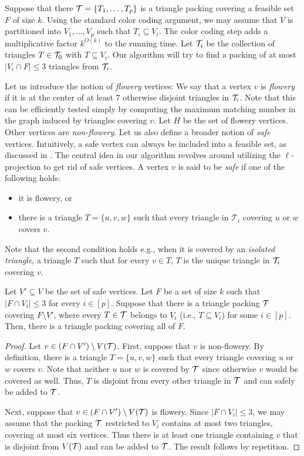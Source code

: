 Suppose that there $\mathcal T=\{T_1,\ldots,T_p\}$ is a triangle packing covering a feasible set $F$ of size $k$.
Using the standard color coding argument, we may assume that $V$ is partitioned into $V_1, \dots, V_p$ such that $T_i \subseteq V_i$.
The color coding step adds a multiplicative factor $k^{O(k)}$ to the running time.
Let $\mathcal T_i$ be the collection of triangles $T \in \mathcal T_0$ with $T \subseteq V_i$.
Our algorithm will try to find a packing of at most $|V_i \cap F| \le 3$ triangles from $\mathcal T_i$.

Let us introduce the notion of \emph{flowery} vertices:
We say that a vertex $v$ is \emph{flowery} if it is at the center of at least
$7$ otherwise disjoint triangles in $\mathcal T_i$.
Note that this can be efficiently
tested simply by computing the maximum
matching number in the graph induced by triangles covering $v$.
Let $H$ be the set of flowery vertices.
Other vertices are \emph{non-flowery}.
Let us also define a broader notion of \emph{safe} vertices.
Intuitively, a safe vertex can always be included into a feasible set, as discussed in .
The central idea in our algorithm revolves around utilizing the $\ell$-projection to get rid of safe vertices.
A vertex $v$ is said to be \emph{safe} if one of the following holds:
\begin{itemize}
  \item 
  it is flowery, or
  \item
  there is a triangle $T = \{ u, v, w \}$ such that every triangle in $\mathcal{T}_i$ covering $u$ or $w$ covers $v$.
\end{itemize}
Note that the second condition holds e.g., when it is covered by an \emph{isolated triangle}, a triangle $T$ such that for every $v \in T$, $T$ is the unique triangle in $\mathcal T_i$ covering $v$.

\begin{lemma} \label{lemma:completable-packing}
  Let $V' \subseteq V$ be the set of safe vertices. 
  Let $F$ be a set of size $k$ such that $|F \cap V_i| \le 3$ for every $i \in [p]$.
  Suppose that there is a triangle packing $\mathcal T$ covering $F \setminus V'$, where every $T \in \mathcal T$ belongs to $V_i$ (i.e., $T \subseteq V_i$) for some $i \in [p]$.
  Then, there is a triangle packing covering all of $F$. 
\end{lemma}
\begin{proof}
  Let $v \in (F \cap V') \setminus V(\mathcal T)$.
  First, suppose that $v$ is non-flowery. 
  By definition, there is a triangle $T = \{ u, v, w \}$ such that every triangle covering $u$ or $w$ covers $v$.
  Note that neither $u$ nor $w$ is covered by $\mathcal T$ since otherwise $v$ would be covered as well.
  Thus, $T$ is disjoint from every other triangle in $\mathcal T$ and can safely be
  added to $\mathcal T$.

  Next, suppose that $v \in (F \cap V') \setminus V(\mathcal T)$ is flowery.
  Since $|F \cap V_i| \le 3$, we may assume that the packing $\mathcal T$ restricted to $V_i$ contains at most two triangles, covering at most six vertices.
  Thus there is at least
  one triangle containing $v$ that is disjoint
  from $V(\mathcal T)$ and can be added to $\mathcal T$. The result follows by
  repetition. 
\end{proof}

